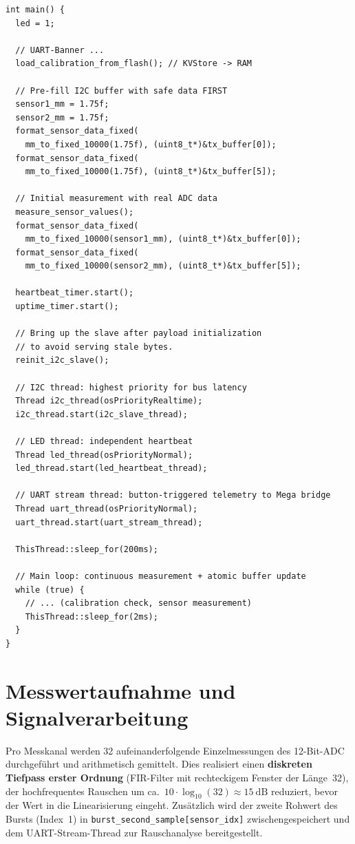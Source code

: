 \begin{lstlisting}[style=firmwarestyle, caption={Thread-Erzeugung und Initialisierung in \texttt{main()} (\texttt{main.cpp}, Z.~435--528).}, label={lst:sensor_thread_creation}]
int main() {
  led = 1;

  // UART-Banner ...
  load_calibration_from_flash(); // KVStore -> RAM

  // Pre-fill I2C buffer with safe data FIRST
  sensor1_mm = 1.75f;
  sensor2_mm = 1.75f;
  format_sensor_data_fixed(
    mm_to_fixed_10000(1.75f), (uint8_t*)&tx_buffer[0]);
  format_sensor_data_fixed(
    mm_to_fixed_10000(1.75f), (uint8_t*)&tx_buffer[5]);

  // Initial measurement with real ADC data
  measure_sensor_values();
  format_sensor_data_fixed(
    mm_to_fixed_10000(sensor1_mm), (uint8_t*)&tx_buffer[0]);
  format_sensor_data_fixed(
    mm_to_fixed_10000(sensor2_mm), (uint8_t*)&tx_buffer[5]);

  heartbeat_timer.start();
  uptime_timer.start();

  // Bring up the slave after payload initialization
  // to avoid serving stale bytes.
  reinit_i2c_slave();

  // I2C thread: highest priority for bus latency
  Thread i2c_thread(osPriorityRealtime);
  i2c_thread.start(i2c_slave_thread);

  // LED thread: independent heartbeat
  Thread led_thread(osPriorityNormal);
  led_thread.start(led_heartbeat_thread);

  // UART stream thread: button-triggered telemetry to Mega bridge
  Thread uart_thread(osPriorityNormal);
  uart_thread.start(uart_stream_thread);

  ThisThread::sleep_for(200ms);

  // Main loop: continuous measurement + atomic buffer update
  while (true) {
    // ... (calibration check, sensor measurement)
    ThisThread::sleep_for(2ms);
  }
}
\end{lstlisting}

\section{Messwertaufnahme und Signalverarbeitung}
\label{sec:sensor_adc}


Pro Messkanal werden \num{32} aufeinanderfolgende Einzelmessungen des 12-Bit-ADC durchgeführt und arithmetisch gemittelt.
Dies realisiert einen \textbf{diskreten Tiefpass erster Ordnung} (FIR-Filter mit rechteckigem Fenster der Länge~\num{32}), der hochfrequentes Rauschen um ca.\ $10 \cdot \log_{10}(32) \approx \qty{15}{\deci\bel}$ reduziert, bevor der Wert in die Linearisierung eingeht.
Zusätzlich wird der zweite Rohwert des Bursts (Index~1) in \texttt{burst\_second\_sample[sensor\_idx]} zwischengespeichert und dem UART-Stream-Thread zur Rauschanalyse bereitgestellt.

